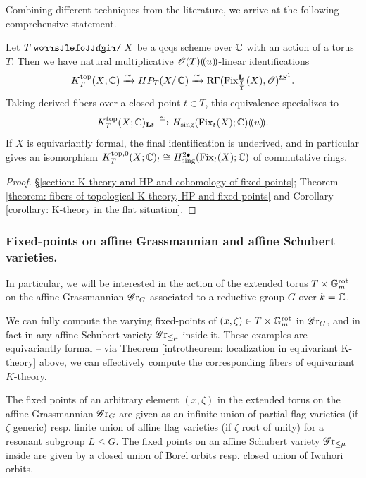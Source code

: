 Combining different techniques from the literature, we arrive at the following comprehensive statement.

\begin{theorem}\label{introtheorem: localization in equivariant K-theory}
Let $T \acts X$ be a qcqs scheme over $\operatorname{\mathbb{C}}$ with an action of a torus $T$. Then we have natural multiplicative $\operatorname{\mathscr{O}}(T)(\!( u )\!)$-linear identifications
\begin{equation*}
    K^{\mathrm{top}}_{T}(X; \operatorname{\mathbb{C}}) \xrightarrow{\simeq} HP_{T}(X / \operatorname{\mathbb{C}}) \xrightarrow{\simeq} \operatorname{R\Gamma}(\operatorname{Fix}^{\mathbf{L}}_{\frac{T}{T}}(X), \operatorname{\mathscr{O}})^{tS^1}.
\end{equation*}
Taking derived fibers over a closed point $t \in T$, this equivalence specializes to
\begin{equation*}
    K^{\mathrm{top}}_{T}(X; \operatorname{\mathbb{C}})_{\mathbf{L} t} \xrightarrow{\simeq} H_{\mathrm{sing}}(\operatorname{Fix}_{t}(X); \operatorname{\mathbb{C}})(\!( u )\!).
\end{equation*}
If $X$ is equivariantly formal, the final identification is underived, and in particular gives an isomorphism $K^{\mathrm{top}, 0}_{T}(X; \operatorname{\mathbb{C}})_{t} \cong H^{2\bullet}_{\mathrm{sing}}(\operatorname{Fix}_{t}(X); \operatorname{\mathbb{C}})$ of commutative rings.
\end{theorem}
\begin{proof}
\S \ref{section: K-theory and HP and cohomology of fixed points}; Theorem \ref{theorem: fibers of topological K-theory, HP and fixed-points} and Corollary \ref{corollary: K-theory in the flat situation}. 
\end{proof}

\subsubsection{Fixed-points on affine Grassmannian and  affine Schubert varieties.}
In particular, we will be interested in the action of the extended torus $T \times \mathbb{G}_m^{\mathrm{rot}}$ on the affine Grassmannian $\operatorname{\mathscr{G}r}_G$ associated to a reductive group $G$ over $k=\operatorname{\mathbb{C}}$.

We can fully compute the varying fixed-points of $(x, \zeta) \in T \times \mathbb{G}_m^{\mathrm{rot}}$ in $\operatorname{\mathscr{G}r}_G$, and in fact in any affine Schubert variety $\operatorname{\mathscr{G}r}_{\leq \mu}$ inside it. These examples are equivariantly formal -- via Theorem \ref{introtheorem: localization in equivariant K-theory} above, we can effectively compute the corresponding fibers of equivariant $K$-theory.

\begin{motto}
    The fixed points of an arbitrary element $(x, \zeta)$ in the extended torus on the affine Grassmannian $\operatorname{\mathscr{G}r}_G$ are given as an infinite union of partial flag varieties (if $\zeta$ generic) resp. finite union of affine flag varieties (if $\zeta$ root of unity) for a resonant subgroup $L \leq G$. The fixed points on an affine Schubert variety $\operatorname{\mathscr{G}r}_{\leq \mu}$ inside are given by a closed union of Borel orbits resp. closed union of Iwahori orbits.
\end{motto}

